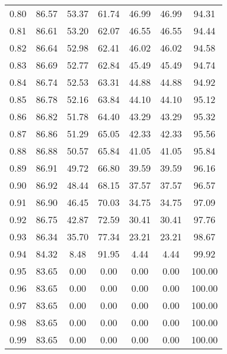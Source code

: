 \begin{tabular}{|c|c|c|c|c|c|c|}
      0.80 &     86.57 &     53.37 &      61.74 &   46.99 &      46.99 &         94.31 \\
      0.81 &     86.61 &     53.20 &      62.07 &   46.55 &      46.55 &         94.44 \\
      0.82 &     86.64 &     52.98 &      62.41 &   46.02 &      46.02 &         94.58 \\
      0.83 &     86.69 &     52.77 &      62.84 &   45.49 &      45.49 &         94.74 \\
      0.84 &     86.74 &     52.53 &      63.31 &   44.88 &      44.88 &         94.92 \\
      0.85 &     86.78 &     52.16 &      63.84 &   44.10 &      44.10 &         95.12 \\
      0.86 &     86.82 &     51.78 &      64.40 &   43.29 &      43.29 &         95.32 \\
      0.87 &     86.86 &     51.29 &      65.05 &   42.33 &      42.33 &         95.56 \\
      0.88 &     86.88 &     50.57 &      65.84 &   41.05 &      41.05 &         95.84 \\
      0.89 &     86.91 &     49.72 &      66.80 &   39.59 &      39.59 &         96.16 \\
      0.90 &     86.92 &     48.44 &      68.15 &   37.57 &      37.57 &         96.57 \\
      0.91 &     86.90 &     46.45 &      70.03 &   34.75 &      34.75 &         97.09 \\
      0.92 &     86.75 &     42.87 &      72.59 &   30.41 &      30.41 &         97.76 \\
      0.93 &     86.34 &     35.70 &      77.34 &   23.21 &      23.21 &         98.67 \\
      0.94 &     84.32 &      8.48 &      91.95 &    4.44 &       4.44 &         99.92 \\
      0.95 &     83.65 &      0.00 &       0.00 &    0.00 &       0.00 &        100.00 \\
      0.96 &     83.65 &      0.00 &       0.00 &    0.00 &       0.00 &        100.00 \\
      0.97 &     83.65 &      0.00 &       0.00 &    0.00 &       0.00 &        100.00 \\
      0.98 &     83.65 &      0.00 &       0.00 &    0.00 &       0.00 &        100.00 \\
      0.99 &     83.65 &      0.00 &       0.00 &    0.00 &       0.00 &        100.00 \\
\bottomrule
\end{tabular}
